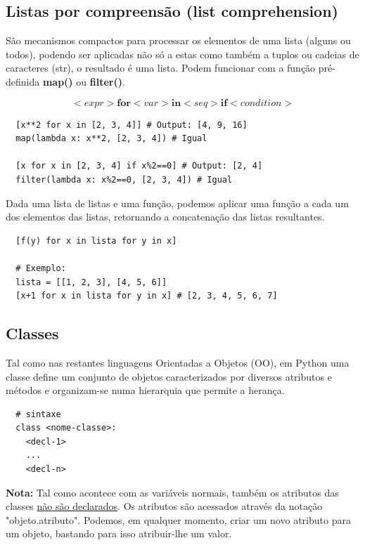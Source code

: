\documentclass{article}
\begin{document}
\pagebreak

\subsection{Listas por compreensão (list comprehension)}

São mecanismos compactos para processar os elementos de uma lista (alguns ou todos), podendo ser aplicadas
não só a estas como também a tuplos ou cadeias de caracteres (str), o resultado é uma lista. Podem funcionar com a
função pré-definida \textbf{map()} ou \textbf{filter()}.

\[<expr> \textbf{for} <var> \textbf{in} <seq> \textbf{if} <condition>\]

\begin{lstlisting}
  [x**2 for x in [2, 3, 4]] # Output: [4, 9, 16]
  map(lambda x: x**2, [2, 3, 4]) # Igual

  [x for x in [2, 3, 4] if x%2==0] # Output: [2, 4]
  filter(lambda x: x%2==0, [2, 3, 4]) # Igual
\end{lstlisting}

Dada uma lista de listas e uma função, podemos aplicar uma função
a cada um dos elementos das listas, retornando a concatenação
das listas resultantes.

\begin{lstlisting}
  [f(y) for x in lista for y in x]

  # Exemplo:
  lista = [[1, 2, 3], [4, 5, 6]]
  [x+1 for x in lista for y in x] # [2, 3, 4, 5, 6, 7]
\end{lstlisting}

\subsection{Classes}

Tal como nas restantes linguagens Orientadas a Objetos (OO), em Python uma classe define
um conjunto de objetos caracterizados por diversos atributos e métodos e organizam-se numa
hierarquia que permite a herança.

\begin{lstlisting}
  # sintaxe
  class <nome-classe>:
    <decl-1>
    ...
    <decl-n>
\end{lstlisting}

\begin{flushleft}
  \textbf{Nota:} Tal como acontece com as variáveis normais, também
  os atributos das classes \uline{não são declarados}. Os atributos são
  acessados através da notação "objeto.atributo". Podemos, em qualquer momento,
  criar um novo atributo para um objeto, bastando para isso atribuir-lhe um valor.
\end{flushleft}
\end{document}
